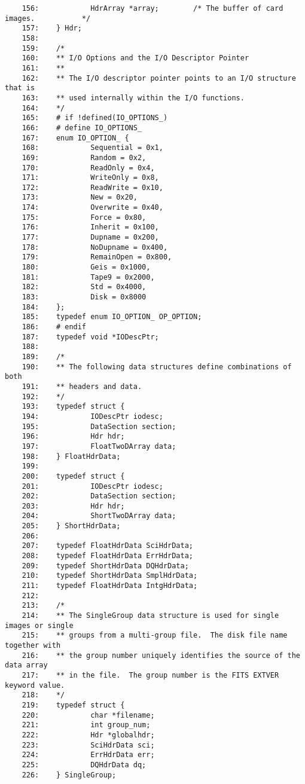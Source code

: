 \begin{scriptsize}
\begin{verbatim}
    156:            HdrArray *array;        /* The buffer of card images.           */
    157:    } Hdr;
    158:    
    159:    /*
    160:    ** I/O Options and the I/O Descriptor Pointer
    161:    **
    162:    ** The I/O descriptor pointer points to an I/O structure that is
    163:    ** used internally within the I/O functions.
    164:    */
    165:    # if !defined(IO_OPTIONS_)
    166:    # define IO_OPTIONS_
    167:    enum IO_OPTION_ {
    168:            Sequential = 0x1, 
    169:            Random = 0x2,
    170:            ReadOnly = 0x4,
    171:            WriteOnly = 0x8,
    172:            ReadWrite = 0x10,
    173:            New = 0x20,
    174:            Overwrite = 0x40,
    175:            Force = 0x80,
    176:            Inherit = 0x100,
    177:            Dupname = 0x200,
    178:            NoDupname = 0x400,
    179:            RemainOpen = 0x800,
    180:            Geis = 0x1000,
    181:            Tape9 = 0x2000,
    182:            Std = 0x4000,
    183:            Disk = 0x8000
    184:    };
    185:    typedef enum IO_OPTION_ OP_OPTION;
    186:    # endif
    187:    typedef void *IODescPtr;
    188:    
    189:    /*
    190:    ** The following data structures define combinations of both
    191:    ** headers and data.
    192:    */
    193:    typedef struct {
    194:            IODescPtr iodesc;
    195:            DataSection section;
    196:            Hdr hdr;
    197:            FloatTwoDArray data;
    198:    } FloatHdrData;
    199:    
    200:    typedef struct {
    201:            IODescPtr iodesc;
    202:            DataSection section;
    203:            Hdr hdr;
    204:            ShortTwoDArray data;
    205:    } ShortHdrData;
    206:    
    207:    typedef FloatHdrData SciHdrData;
    208:    typedef FloatHdrData ErrHdrData;
    209:    typedef ShortHdrData DQHdrData;
    210:    typedef ShortHdrData SmplHdrData;
    211:    typedef FloatHdrData IntgHdrData;
    212:    
    213:    /*
    214:    ** The SingleGroup data structure is used for single images or single 
    215:    ** groups from a multi-group file.  The disk file name together with
    216:    ** the group number uniquely identifies the source of the data array
    217:    ** in the file.  The group number is the FITS EXTVER keyword value.
    218:    */
    219:    typedef struct {
    220:            char *filename;
    221:            int group_num;
    222:            Hdr *globalhdr;
    223:            SciHdrData sci;
    224:            ErrHdrData err;
    225:            DQHdrData dq;
    226:    } SingleGroup;

\end{verbatim}
\end{scriptsize}

